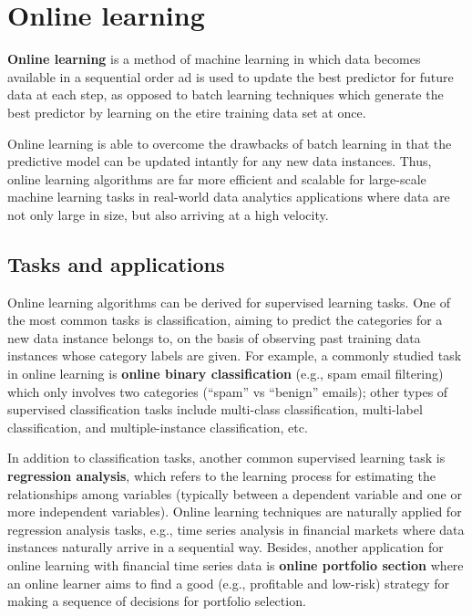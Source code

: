\section{Online learning}
\textbf{Online learning} is a method of machine learning in which data becomes available in a sequential order ad is used to update the best predictor for future data at each step, as opposed to batch learning techniques which generate the best predictor by learning on the etire training data set at once.

Online learning is able to overcome the drawbacks of batch learning in that the predictive model can be updated intantly for any new data instances. Thus, online learning algorithms are far more efficient and scalable for large-scale machine learning tasks in real-world data analytics applications where data are not only large in size, but also arriving at a high velocity.

\subsection{Tasks and applications}

Online learning algorithms can be derived for supervised learning tasks. One of the most common tasks is classification, aiming to predict the categories for a new data instance belongs to, on the basis of observing past training data instances whose category labels are given. For example, a commonly studied task in online learning is \textbf{online binary classification} (e.g., spam email filtering) which only involves two categories (“spam” vs “benign” emails); other types of supervised classification tasks include multi-class classification, multi-label classification, and multiple-instance classification, etc.

In addition to classification tasks, another common supervised learning task is \textbf{regression analysis}, which refers to the learning process for estimating the relationships among variables (typically between a dependent variable and one or more independent variables). Online learning techniques are naturally applied for regression analysis tasks, e.g., time series analysis in financial markets where data instances naturally arrive in a sequential way. Besides, another application for online learning with financial time series data is \textbf{online portfolio section} where an online learner aims to find a good (e.g., profitable and low-risk) strategy for making a sequence of decisions for portfolio selection.

